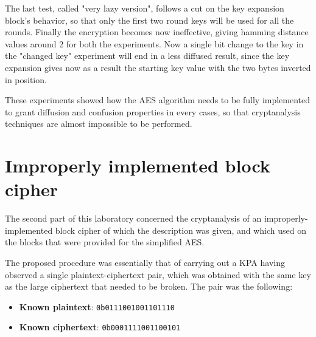 \documentclass[12pt]{article}
\begin{document}
The last test, called "very lazy version", follows a cut on the key expansion block's behavior, so that only the first two round keys will be used for all the rounds. Finally the encryption becomes now ineffective, giving hamming distance values around {\color{blue}2} for both the experiments. Now a single bit change to the key in the "changed key" experiment will end in a less diffused result, since the key expansion gives now as a result the starting key value with the two bytes inverted in position.

These experiments showed how the AES algorithm needs to be fully implemented to grant diffusion and confusion properties in every cases, so that cryptanalysis techniques are almost impossible to be performed.

\begin{table}[h!]
    \centering
    \caption{Average hamming distance between ciphetexts}
\end{table}


\section{Improperly implemented block cipher}
\label{sec:03}

The second part of this laboratory concerned the cryptanalysis of an improperly-implemented block cipher of which the description was given, and which used on the blocks that were provided for the simplified AES.

The proposed procedure was essentially that of carrying out a KPA having observed a single plaintext-ciphertext pair, which was obtained with the same key as the large ciphertext that needed to be broken.
The pair was the following:

\begin{itemize}
   \item \textbf{Known plaintext}: \verb|0b0111001001101110|
   \item \textbf{Known ciphertext}: \verb|0b0001111001100101| 
\end{itemize}
\end{document}
